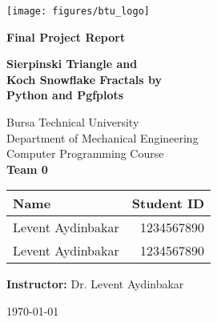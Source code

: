 \documentclass[twocolumn]{article}
\begin{document}
\begin{titlepage}

\centering

\texttt{[image: figures/btu\_logo]}%

\vspace{1cm}
{\Huge \textbf{Final Project Report }}

\vspace{1cm}
{\Huge \textbf{Sierpinski Triangle and \\ Koch Snowflake Fractals by \\ Python and Pgfplots}}

\vspace{1cm}
\LARGE Bursa Technical University \\
Department of Mechanical Engineering \\
Computer Programming Course \\


\Large
\vspace{1cm}
\textbf{Team 0}
\begin{center}
  \begin{tabular}{ l r }
Name & Student ID \\ \hline
Levent Aydinbakar & 1234567890 \\ 
Levent Aydinbakar & 1234567890 \\ \end{tabular}
\end{center}

\vspace{1cm}
\large \textbf{Instructor:} Dr. Levent Aydinbakar \\

\vfill

\begin{abstract}

\end{abstract}

\vspace{1cm}
\large \today

\end{titlepage}

\onecolumn
\tableofcontents
\listoffigures
\listoftables
\twocolumn










\newpage
\newpage
\onecolumn



\appendix




\end{document}
